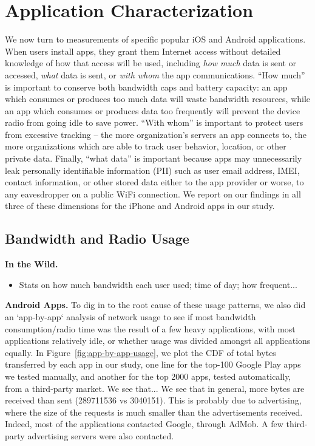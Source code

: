 \section{Application Characterization}
\label{sec:characterize-app}

  We now turn to measurements of specific popular iOS and Android applications. 
  When users install apps, they grant them Internet access without detailed knowledge of how that access will be used, including {\it how much} data is sent or accessed, {\it what} data is sent,  or {\it with whom} the app communications.
  ``How much'' is important to conserve both bandwidth caps and battery capacity: an app which consumes or produces too much data will waste bandwidth resources, while an app which consumes or produces data too frequently will prevent the device radio from going idle to save power.
  ``With whom'' is important to protect users from excessive tracking -- the more organization's servers an app connects to, the more organizations which are able to track user behavior, location, or other private data.
  Finally, ``what data'' is important because apps may unnecessarily leak personally identifiable information (PII) such as user email address, IMEI, contact information, or other stored data either to the app provider or worse, to any eavesdropper on a public WiFi connection.
  We  report on our findings in all three of these dimensions for the iPhone and Android apps in our study.

\subsection{Bandwidth and Radio Usage}

  {\bf In the Wild.}
    \begin{itemize}
      \item Stats on how much bandwidth each user used; time of day; how frequent...
    \end{itemize}

  {\bf Android Apps.}
    To dig in to the root cause of these usage patterns, we also did an `app-by-app` analysis of network usage to see if most bandwidth consumption/radio time was the result of a few heavy applications, with most applications relatively idle, or whether usage was divided amongst all applications equally.
    In Figure~\ref{fig:app-by-app-usage}, we plot the CDF of total bytes transferred by each app in our study, one line for the top-100 Google Play apps we tested manually, and another for the top 2000 apps, tested automatically, from a third-party market.
    We see that...
    We see that in general, more bytes are received than sent (289711536 vs 3040151). This is probably due to advertising, where the size of the requests is much smaller than the advertisements received. Indeed, most of the applications contacted Google, through AdMob. A few third-party advertising servers were also contacted. 
    
